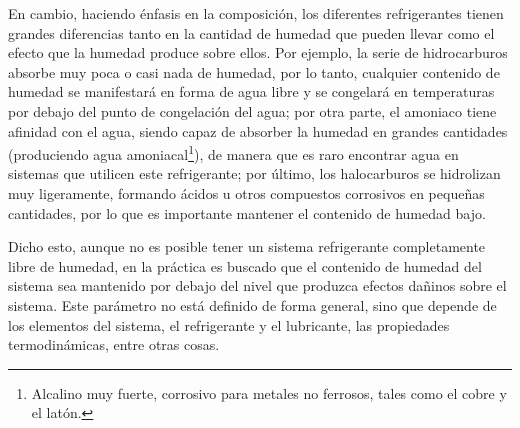 	En cambio, haciendo énfasis en la composición, los diferentes refrigerantes tienen grandes diferencias tanto en la cantidad de humedad que pueden llevar como el efecto que la humedad produce sobre ellos. Por ejemplo, la serie de hidrocarburos absorbe muy poca o casi nada de humedad, por lo tanto, cualquier contenido de humedad se manifestará en forma de agua libre y se congelará en temperaturas por debajo del punto de congelación del agua; por otra parte, el amoniaco tiene afinidad con el agua, siendo capaz de absorber la humedad en grandes cantidades (produciendo agua amoniacal\footnote{Alcalino muy fuerte, corrosivo para metales no ferrosos, tales como el cobre y el latón.}), de manera que es raro encontrar agua en sistemas que utilicen este refrigerante; por último, los halocarburos se hidrolizan muy ligeramente, formando ácidos u otros compuestos corrosivos en pequeñas cantidades, por lo que es importante mantener el contenido de humedad bajo. 

	Dicho esto, aunque no es posible tener un sistema refrigerante completamente libre de humedad, en la práctica es buscado que el contenido de humedad del sistema sea mantenido por debajo del nivel que produzca efectos dañinos sobre el sistema. Este parámetro no está definido de forma general, sino que depende de los elementos del sistema, el refrigerante y el lubricante, las propiedades termodinámicas, entre otras cosas. 






